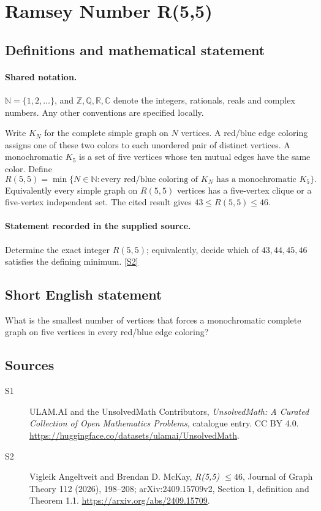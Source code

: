 \documentclass[11pt]{article}
\newcommand{\sref}[2]{\hyperlink{source:#1:#2}{[S#2]}}
\begin{document}
\section{Ramsey Number R(5,5)}\label{statement}

\subsection{Definitions and mathematical statement}

\paragraph{Shared notation.}$\mathbb N=\{1,2,\ldots\}$, and $\mathbb Z,\mathbb Q,\mathbb R,\mathbb C$ denote the integers, rationals, reals and complex numbers. Any other conventions are specified locally.


Write \(K_N\) for the complete simple graph on \(N\) vertices.
A red/blue edge coloring assigns one of these two colors to each
unordered pair of distinct vertices. A monochromatic \(K_5\)
is a set of five vertices whose ten mutual edges have the same color.
Define
\[
 R(5,5)=\min\{N\in\mathbb N:\text{every red/blue coloring of }K_N
                          \text{ has a monochromatic }K_5\}.
\]
Equivalently every simple graph on \(R(5,5)\) vertices has a
five-vertex clique or a five-vertex independent set.
The cited result gives \(43\le R(5,5)\le46\).
\paragraph{Statement recorded in the supplied source.}
Determine the exact integer \(R(5,5)\); equivalently, decide
which of \(43,44,45,46\) satisfies the defining minimum. \sref{statement}{2}
\subsection{Short English statement}
What is the smallest number of vertices that forces a monochromatic complete graph on five vertices in every red/blue edge coloring?
\subsection{Sources}
\begin{description}
\item[\hypertarget{source:statement:1}{S1}] ULAM.AI and the UnsolvedMath Contributors, \emph{UnsolvedMath: A Curated Collection of Open Mathematics Problems}, catalogue entry. CC BY 4.0. \url{https://huggingface.co/datasets/ulamai/UnsolvedMath}.
\item[\hypertarget{source:statement:2}{S2}] Vigleik Angeltveit and Brendan D. McKay, \emph{R(5,5) $\le46$}, Journal of Graph Theory 112 (2026), 198--208; arXiv:2409.15709v2, Section 1, definition and Theorem 1.1. \url{https://arxiv.org/abs/2409.15709}.
\end{description}
\label{end:statement}
\end{document}
